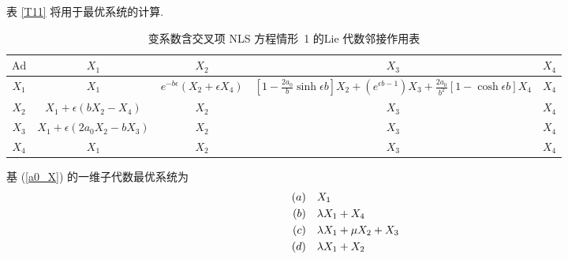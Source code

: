 表 \ref{T11} 将用于最优系统的计算.
\begin{table}\caption{变系数含交叉项 NLS 方程情形~1 的Lie 代数邻接作用表}\label{T12}
\begin{center}
\begin{tabular}[Table 12]{|c|c|c|c|c|}
\hline
  $\text{Ad}$ & $X_1$ & $X_2$ & $X_3$ & $X_4$\\
  \hline
  $X_1$& $X_1$ &$e^{-b\epsilon}(X_2+\epsilon X_4)$&
  $[1-\frac{2a_0}{b}\sinh {\epsilon b}]X_2+(e^{\epsilon b-1})X_3+\frac{2a_0}{b^2}[1-\cosh{\epsilon b}]X_4$
  & $X_4$\\
  \hline
  $X_2$ &$X_1+\epsilon(bX_2-X_4)$& $X_2$ & $X_3$ & $X_4$\\
  \hline
  $X_3$ & $X_1+\epsilon(2a_0X_2-bX_3)$ & $X_2$ & $X_3$ & $X_4$\\
  \hline
  $X_4$ & $X_1$ & $X_2$ & $X_3$ &$X_4$\\
  \hline
\end{tabular}
\end{center}
\end{table}


基 (\ref{a0_X}) 的一维子代数最优系统为
\begin{align}
(a)& \quad X_1\notag\\
(b)& \quad \lambda X_1+X_4\notag\\
(c)& \quad \lambda X_1+\mu X_2+X_3\notag\\
(d)& \quad \lambda X_1+X_2
\end{align}


